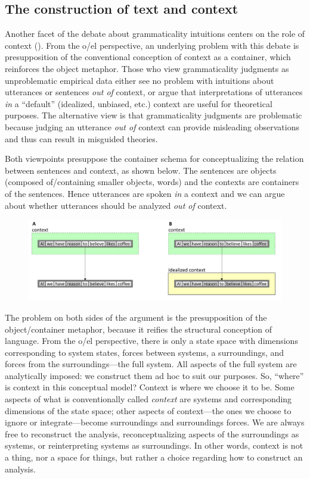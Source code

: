\subsection{The construction of text and context}

Another facet of the debate about grammaticality intuitions centers on the role of context (\citealt{Bolinger1965,Keller2000,Schütze2016}). From the o/el perspective, an underlying problem with this debate is presupposition of the conventional conception of context as a container, which reinforces the object metaphor. Those who view grammaticality judgments as unproblematic empirical data either  see no problem with intuitions about utterances or sentences \textit{out of} context, or  argue that interpretations of utterances \textit{in} a “default” (idealized, unbiased, etc.) context are useful for theoretical purposes. The alternative view is that grammaticality judgments are problematic because judging an utterance \textit{out of} context can provide misleading observations and thus can result in misguided theories.

  Both viewpoints presuppose the container schema for conceptualizing the relation between sentences and context, as shown below. The sentences are objects (composed of/containing smaller objects, words) and the contexts are containers of the sentences. Hence utterances are spoken \textit{in} a context and we can argue about whether utterances should be analyzed \textit{out of} context.   

  
\begin{figure}
\includegraphics[width=\textwidth]{figures/Tilsen-img120.png}
\caption{\missingcaption}
\label{fig:6:1}
\end{figure}
 

  The problem on both sides of the argument is the presupposition of the object/container metaphor, because it reifies the structural conception of language. From the o/el perspective, there is only a state space with dimensions corresponding to system states, forces between systems, a surroundings, and forces from the surroundings—the full system. All aspects of the full system are analytically imposed: we construct them ad hoc to suit our purposes. So, “where” is context in this conceptual model? Context is where we choose it to be. Some aspects of what is conventionally called \textit{context} are systems and corresponding dimensions of the state space; other aspects of context—the ones we choose to ignore or integrate—become surroundings and surroundings forces. We are always free to reconstruct the analysis, reconceptualizing aspects of the surroundings as systems, or reinterpreting systems as surroundings. In other words, context is not a thing, nor a space for things, but rather a choice regarding how to construct an analysis.

